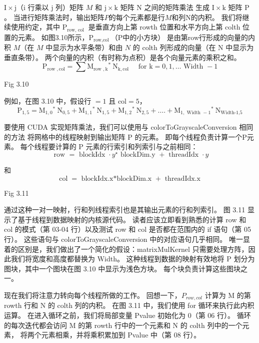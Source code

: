 $\mathrm{I} \times \mathrm{j}$（$\mathrm{i}$ 行乘以 $\mathrm{j}$ 列）矩阵 $M$ 
和 $\mathrm{j} \times \mathrm{k}$ 矩阵 $\mathrm{N}$ 之间的矩阵乘法
生成 $\mathrm{I} \times \mathrm{k}$ 矩阵 $\mathrm{P}$。 
当进行矩阵乘法时，输出矩阵$P$的每个元素都是行$M$和列$\mathrm{N}$的内积。 
我们将继续使用约定，其中 $\mathrm{P}_{\text {row, col }}$ 是垂直方向上第 rowth 位置和水平方向上第 colth 位置的元素。 
如图3.10所示，$\mathrm{P}_{\text {row,col }}$（$\mathrm{P}$中的小方块）
是由第row行形成的向量的内积 $M$（在 $M$ 中显示为水平条带）和由 $N$ 的 colth 列形成的向量（在 N 中显示为垂直条带）。 
两个向量的内积（有时称为点积）是各个向量元素的乘积之和。
$$
\mathrm{P}_{\text {row }, \mathrm{col}}=\sum \mathrm{M}_{\text {row }, \mathrm{k}}{ }^{*} \mathrm{~N}_{\mathrm{k}, \mathrm{col}} \quad \text { for } \mathrm{k}=0,1, \ldots \text { Width }-1
$$

{\color{red} Fig 3.10}

例如，在图 3.10 中，假设行 $=1$ 且 $\mathrm{col}=5$，
$$
\mathrm{P}_{1,5}=\mathrm{M}_{1,0}{ }^{*} \mathrm{~N}_{0,5}+\mathrm{M}_{1,1}{ }^{*} \mathrm{~N}_{1,5}+\mathrm{M}_{1,2}{ }^{*} \mathrm{~N}_{2,5}+\ldots .+\mathrm{M}_{1, \text { Width }-1}{ }^{*} \mathrm{~N}_{\text {Width-1,5}}
$$

要使用 CUDA 实现矩阵乘法，我们可以使用与 colorToGrayscaleConversion 相同的方法
将网格中的线程映射到输出矩阵 P 的元素。 即每个线程负责计算一个P元素。 
每个线程要计算的 P 元素的行索引和列索引与之前相同：
$$
\text { row }=\text { blockIdx } \cdot y^{\star} \text { blockDim.y }+ \text { threadIdx } \cdot y
$$

和
$$
\operatorname{col}=\text { blockIdx.x*blockDim.x }+ \text { threadIdx.x }
$$

{\color{red} Fig 3.11}

通过这种一对一映射，行和列线程索引也是其输出元素的行和列索引。 图 3.11 显示了基于线程到数据映射的内核源代码。 
读者应该立即看到熟悉的计算 row 和 col 的模式（第 03-04 行）以及测试 row 和 col 是否都在范围内的 if 语句（第 05 行）。 
这些语句与 colorToGrayscaleConversion 中的对应语句几乎相同。 
唯一显着的区别是，我们做出了一个简化的假设：matrixMulKernel 只需要处理方阵，因此我们将宽度和高度都替换为 Width。 
这种线程到数据的映射有效地将 P 划分为图块，其中一个图块在图 3.10 中显示为浅色方块。 每个块负责计算这些图块之一。

现在我们将注意力转向每个线程所做的工作。 回想一下，$P_{row,col}$ 计算为 M 的第 rowth 行和 N 的 colth 列的内积。
在图 3.11 中，我们使用 for 循环来执行此内积运算。 在进入循环之前，我们将局部变量 Pvalue 初始化为 0（第 06 行）。 
循环的每次迭代都会访问 M 的第 rowth 行中的一个元素和 N 的 colth 列中的一个元素，
将两个元素相乘，并将乘积累加到 Pvalue 中（第 08 行）。

